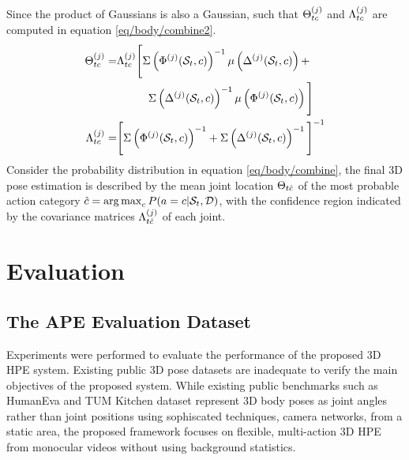 Since the product of Gaussians is also a Gaussian, such that $\Theta^{(j)}_{t c}$ and $\Lambda^{(j)}_{t c}$ are computed in equation \ref{eq/body/combine2}.  
\begin{equation}
	\label{eq/body/combine2}
	\begin{split}
		\finalbodypose^{(j)}_{\timenow c} = & \finalvariance^{(j)}_{\timenow c} 
		\Bigg[
			\Sigma\left(\Phi^{(j)}(\snippetnow, c)\right)^{-1} 
			\mu\left(\toffsetfunc^{(j)}(\snippetnow, c)\right) + \\ 
			& \hspace{10mm} \Sigma\left(\toffsetfunc^{(j)}(\snippetnow, c)\right)^{-1} 
			\mu\left(\Phi^{(j)}(\snippetnow, c)\right)
		\Bigg] \\  
		\finalvariance^{(j)}_{\timenow c} = &  
		\Bigg[
			\Sigma\left(\Phi^{(j)}(\snippetnow, c)\right)^{-1}
			+
			\Sigma\left(\toffsetfunc^{(j)}(\snippetnow, c)\right)^{-1} 
		\Bigg]^{-1}
		\end{split}
	\end{equation}
	Consider the probability distribution in equation \ref{eq/body/combine}, the final 3D pose estimation is described by the mean joint location $\Theta_{t\hat{c}}$ of the most probable action category $\hat{c} = \operatorname*{arg\,max}_c  P(a = c | \mathcal{S}_{t}, \mathcal{D})$, with the confidence region indicated by the covariance matrices $\Lambda^{(j)}_{t\hat{c}}$ of each joint. 

\section{Evaluation}
\label{sec/body/evaluation}

\subsection{The APE Evaluation Dataset}
Experiments were performed to evaluate the performance of the proposed 3D HPE system.
Existing public 3D pose datasets are inadequate to verify the main objectives of the proposed system.  
While existing public benchmarks such as HumanEva \cite{Sigal2010} and TUM Kitchen dataset \cite{Yao2012} represent 3D body poses as joint angles rather than joint positions using sophiscated techniques, \eg camera networks, from a static area, the proposed framework focuses on flexible, multi-action 3D HPE from monocular videos without using background statistics.

